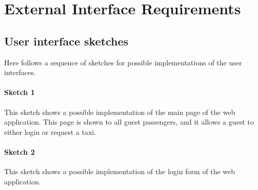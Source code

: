 \section{External Interface Requirements}
\subsection{User interface sketches}
Here follows a sequence of sketches for possible implementations of the user interfaces.


\paragraph{Sketch 1}
This sketch shows a possible implementation of the main page of the web application. This page is shown to all guest passengers, and it allows a guest to either login or request a taxi.
\begin{figure}[H]
\centering
{}
\end{figure}


\paragraph{Sketch 2}
This sketch shows a possible implementation of the login form of the web application.
\begin{figure}[H]
\centering
{}
\end{figure}


